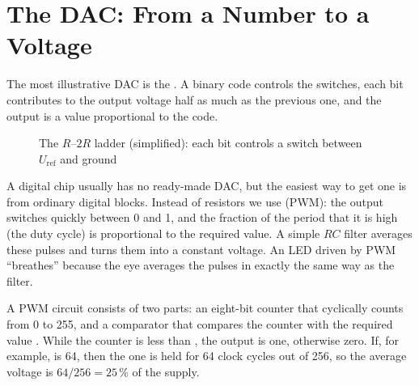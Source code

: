 \section{The DAC: From a Number to a Voltage}

The most illustrative DAC is the . A binary
code controls the switches, each bit contributes to the output voltage
half as much as the previous one, and the output is a value proportional to the
code.

\begin{figure}[H]
\centering
{}
\caption{The $R$--$2R$ ladder (simplified): each bit controls a switch between $U_{\text{ref}}$ and ground}
\end{figure}

A digital chip usually has no ready-made DAC, but the easiest way to get one is
from ordinary digital blocks. Instead of resistors we use
 (PWM): the output switches quickly between 0
and 1, and the fraction of the period that it is high (the duty cycle) is proportional to the required
value. A simple $RC$ filter averages these pulses and turns them into a
constant voltage. An LED driven by PWM ``breathes'' because the eye
averages the pulses in exactly the same way as the filter.

A PWM circuit consists of two parts: an eight-bit counter that
cyclically counts from 0 to 255, and a comparator that compares the counter with the
required value . While the counter is less than , the output is
one, otherwise zero. If, for example,  is 64, then the one is held for
64 clock cycles out of 256, so the average voltage is $64/256 = 25\,\%$ of
the supply.

